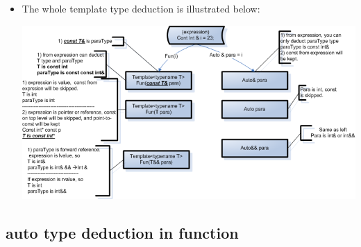 \documentclass[a4paper,11pt,twoside]{book}
\begin{document}
\begin{itemize}
	
\item The whole template type deduction is illustrated below:
\begin{center}
	\includegraphics[scale=0.6]{pics/type_deduct.png}
\end{center}

\end{itemize}

\subsection{auto type deduction in function}
\end{document}
